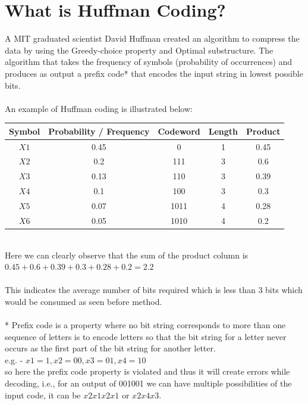 \documentclass{article}
\begin{document}
\vspace{1cm}

\section{What is Huffman Coding?}

\Large{A MIT graduated scientist David Huffman created an algorithm to compress the data by using the Greedy-choice property and Optimal substructure. The algorithm that takes the frequency of symbols (probability of occurrences) and produces as output a prefix code* that encodes the input string in lowest possible bits.\\ \\
An example of Huffman coding is illustrated below:
}

\begin{center}
\begin{tabular}{| c | c | c | c | c |} 
  
  \hline
  Symbol & Probability /
Frequency
 & Codeword & Length  & Product  \\ 
  \hline
  $X1$ & 0.45 & 0 & 1 & 0.45 \\ 
  \hline
  $X2$ & 0.2 & 111 & 3 & 0.6 \\
  \hline
  $X3$ & 0.13 & 110 & 3 & 0.39 \\
  \hline
  $X4$ & 0.1 & 100 & 3 & 0.3 \\
  \hline
  $X5$ & 0.07 & 1011 & 4 & 0.28 \\
  \hline
  $X6$ & 0.05 & 1010 & 4 & 0.2 \\
  \hline
  
\end{tabular}
\end{center}
\\
\Large{Here we can clearly observe that the sum of the product column is \\
$0.45 + 0.6 + 0.39 + 0.3 + 0.28 + 0.2 = 2.2$ \\ \\
This indicates the average number of bits required which is less than 3 bits which would be consumed as seen before method.\\ \\
}
\small{*  Prefix code is a property where no bit string corresponds to more than one sequence of letters is to encode letters so that the bit string for a letter never occurs as the first part of the bit string for another letter.\\

e.g. - $ x1 = 1, x2 = 00, x3 = 01, x4 = 10$\\

so here the prefix code property is violated and thus it will create errors while decoding, i.e., for an output of 001001 we can have multiple possibilities of the input code, it can be $x2x1x2x1$ or $x2x4x3$.}\\
\end{document}
